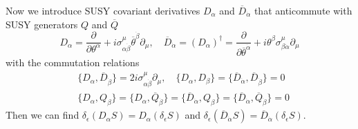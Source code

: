 \documentclass[12pt]{report}
\begin{document}
Now we introduce SUSY covariant derivatives $D_{\alpha}$ and $\overline{D}_{\dot{\alpha}}$ that anticommute with SUSY generators $Q$ and $\overline{Q}$
\begin{equation}
D_{\alpha} = \frac{\partial}{\partial \theta^{\alpha}} + i \sigma^{\mu}_{\alpha \dot{\beta}} \overline{\theta}^{\dot{\beta}} \partial_{\mu}, \quad 
\overline{D}_{\dot{\alpha}} = (D_{\alpha})^{\dag} = \frac{\partial}{\partial \overline{\theta}^{\dot{\alpha}}} + i \theta^{\beta} \sigma^{\mu}_{\beta \dot{\alpha}} \partial_{\mu}
\end{equation}
with the commutation relations
\begin{align*}
& \{ D_{\alpha}, \overline{D}_{\dot{\beta}}\} = 2i \sigma^{\mu}_{\alpha \dot{\beta}} \partial_{\mu}, \quad \{ D_{\alpha}, D_{\beta}\} = \{ \overline{D}_{\dot{\alpha}}, \overline{D}_{\dot{\beta}}\} = 0\\
& \{ D_{\alpha}, Q_{\beta} \} = \{ D_{\alpha}, \overline{Q}_{\dot{\beta}}\} = \{ \overline{D}_{\dot{\alpha}}, Q_{\beta} \} = \{ \overline{D}_{\dot{\alpha}}, \overline{Q}_{\dot{\beta}}\} = 0  
\end{align*}
Then we can find $\delta_{\epsilon} (D_{\alpha} S) = D_{\alpha} (\delta_{\epsilon} S)$ and $\delta_{\epsilon} (\overline{D}_{\dot{\alpha}} S) = \overline{D}_{\dot{\alpha}} (\delta_{\epsilon} S)$.
\end{document}
